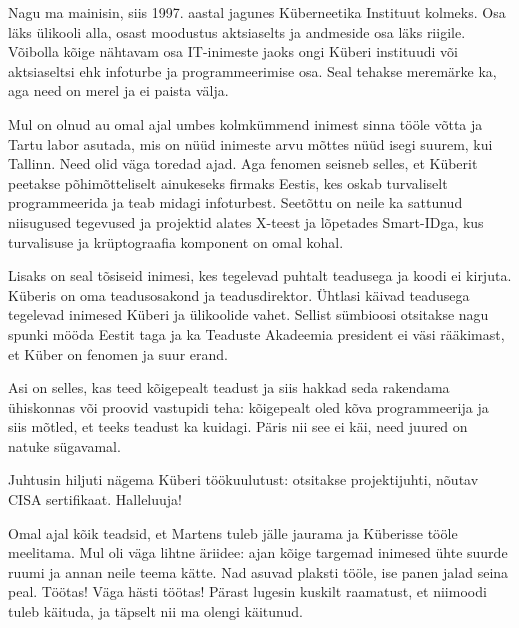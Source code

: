 
Nagu ma mainisin, siis 1997. aastal jagunes Küberneetika Instituut kolmeks. Osa 
läks ülikooli alla, osast moodustus aktsiaselts ja andmeside osa läks riigile. 
Võibolla kõige nähtavam osa IT-inimeste jaoks ongi Küberi instituudi või 
aktsiaseltsi ehk infoturbe ja programmeerimise osa. Seal tehakse meremärke 
ka, aga need on merel ja ei paista välja.

Mul on olnud au omal ajal umbes kolmkümmend inimest sinna tööle võtta ja 
Tartu labor asutada, mis on nüüd inimeste arvu mõttes nüüd isegi suurem, kui Tallinn. Need olid väga toredad ajad. Aga fenomen seisneb selles, et Küberit peetakse põhimõtteliselt ainukeseks firmaks 
Eestis, kes oskab turvaliselt programmeerida ja teab midagi infoturbest. Seetõttu 
on neile ka sattunud niisugused tegevused ja projektid alates X-teest ja 
lõpetades Smart-IDga, kus turvalisuse ja krüptograafia komponent on omal 
kohal. 

Lisaks on seal tõsiseid inimesi, kes tegelevad puhtalt teadusega ja koodi ei 
kirjuta. Küberis on oma teadusosakond ja teadusdirektor. Ühtlasi käivad 
teadusega tegelevad inimesed Küberi ja ülikoolide vahet. Sellist sümbioosi 
otsitakse nagu spunki mööda Eestit taga ja ka Teaduste 
Akadeemia president ei väsi rääkimast, et Küber on fenomen ja suur erand. 


Asi on selles, kas teed kõigepealt teadust ja siis hakkad seda 
rakendama ühiskonnas või proovid vastupidi teha: kõigepealt oled kõva
programmeerija ja siis mõtled, et teeks teadust ka kuidagi. Päris 
nii see ei käi, need juured on natuke sügavamal.

Juhtusin hiljuti nägema Küberi töökuulutust: otsitakse 
projektijuhti, nõutav CISA sertifikaat. 
Halleluuja!

Omal ajal kõik teadsid, et Martens tuleb jälle jaurama ja Küberisse tööle 
meelitama. Mul oli väga lihtne äriidee: ajan kõige targemad 
inimesed ühte suurde ruumi ja annan neile teema kätte. Nad asuvad 
plaksti tööle, ise panen jalad seina peal. Töötas! Väga hästi töötas! Pärast 
lugesin kuskilt raamatust, et niimoodi tuleb käituda, ja täpselt nii ma 
olengi käitunud.

